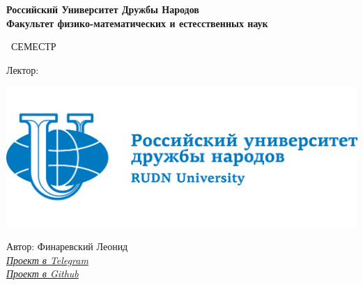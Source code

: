 \begin{titlepage}
	\clearpage\thispagestyle{empty}
	\centering
	
	\textbf{Российский Университет Дружбы Народов \\ Факультет физико-математических и естесственных наук}
	\vspace{33ex}
	
	{\Huge\textbf{\FullCourseNameFirstPart}}
	
	\SemesterNumber\ СЕМЕСТР  
	\vspace{1ex}
	
	Лектор: \textit{\LecturerInitials}
	
	\includegraphics[width=\textwidth]{images/logo.png}

	\begin{flushright}
		\noindent
		Автор: Финаревский Леонид
		\\
		\href{\TGLink}{\textit{Проект в Telegram}}
		\\
		\href{\GitLink}{\textit{Проект в Github}}
	\end{flushright}
	
	\vfill
	\CourseDate
	\pagebreak
\end{titlepage}